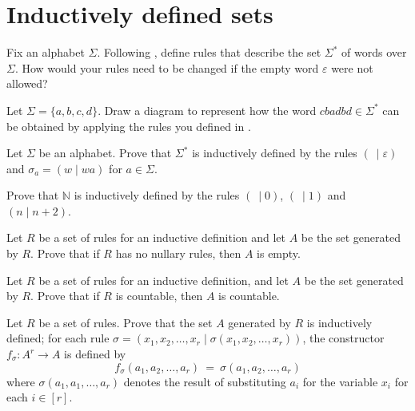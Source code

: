 \section{Inductively defined sets}


\begin{exercise}
\label{exRulesForInductiveDefinitionOfWords}
Fix an alphabet $\Sigma$. Following , define rules that describe the set $\Sigma^*$ of words over $\Sigma$. How would your rules need to be changed if the empty word $\varepsilon$ were not allowed?
\end{exercise}



\begin{exercise}
Let $\Sigma = \{ a,b,c,d \}$. Draw a diagram to represent how the word $cbadbd \in \Sigma^*$ can be obtained by applying the rules you defined in .
\end{exercise}


\begin{exercise}
Let $\Sigma$ be an alphabet. Prove that $\Sigma^*$ is inductively defined by the rules $(~ \mid \varepsilon)$ and $\sigma_a = (w \mid wa)$ for $a \in \Sigma$.
\end{exercise}

\begin{exercise}
Prove that $\mathbb{N}$ is inductively defined by the rules $(~ \mid 0)$, $(~ \mid 1)$ and $(n \mid n+2)$.
\end{exercise}



\begin{exercise}
Let $R$ be a set of rules for an inductive definition and let $A$ be the set generated by $R$. Prove that if $R$ has no nullary rules, then $A$ is empty.
\end{exercise}

\begin{exercise}
Let $R$ be a set of rules for an inductive definition, and let $A$ be the set generated by $R$. Prove that if $R$ is countable, then $A$ is countable.
\end{exercise}

\begin{exercise}
\label{exSetGeneratedByRulesIsInductivelyDefined}
Let $R$ be a set of rules. Prove that the set $A$ generated by $R$ is inductively defined; for each rule $\sigma = (x_1,x_2,\dots,x_r \mid \sigma(x_1,x_2,\dots,x_r))$, the constructor $f_{\sigma} : A^r \to A$ is defined by
\[ f_{\sigma}(a_1,a_2,\dots,a_r) ~=~ \sigma(a_1,a_2,\dots,a_r) \]
where $\sigma(a_1,a_1,\dots,a_r)$ denotes the result of substituting $a_i$ for the variable $x_i$ for each $i \in [r]$.
\end{exercise}




